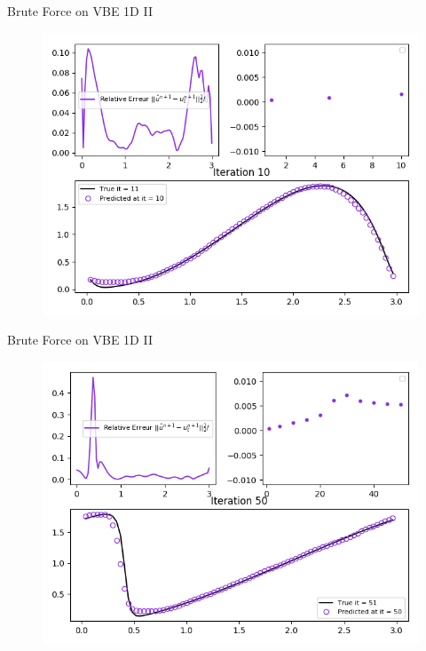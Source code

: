 \documentclass[10pt,
			   xcolor=svgnames,
			   hyperref={linkcolor=red, citecolor = DarkGreen, colorlinks=true, urlcolor=Navy}]{beamer}
\begin{document}
\begin{frame}{Brute Force on VBE 1D II}
	\begin{figure}[H]
	\centering
	\includegraphics[scale=0.5]{Pres_Tenth_Iteration_2.png}
	\end{figure} 
\end{frame}

\begin{frame}{Brute Force on VBE 1D II}
	\begin{figure}[H]
	\centering
	\includegraphics[scale=0.5]{Pres_50th_Iteration_2.png}
	\end{figure} 
\end{frame}
\end{document}
